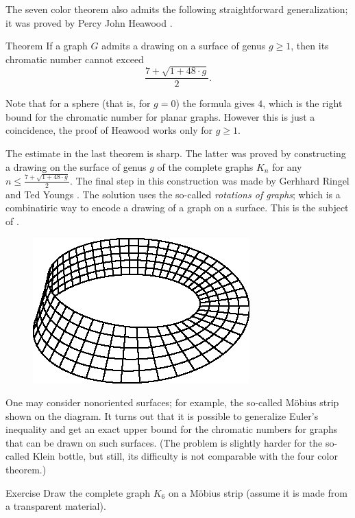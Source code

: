 The seven color theorem also admits the following straightforward generalization;
it was proved by Percy John Heawood \cite{heawood}.

\begin{thm}{Theorem}
If a graph $G$ admits a drawing on a surface of genus $g\ge 1$, 
then its chromatic number cannot exceed 
\[\frac{7+\sqrt{1+48\cdot g}}2.\]
\end{thm}

Note that for a sphere (that is, for $g=0$) the formula gives $4$, which is the right bound for the chromatic number for planar graphs. 
However this is just a coincidence, the proof of Heawood works only for $g\ge 1$.

The estimate in the last theorem is sharp.
The latter was proved by constructing a drawing on the surface of genus $g$
of the complete graphs $K_n$ for any $n\le\frac{7+\sqrt{1+48\cdot g}}2$.
The final step in this construction was made by Gerhhard Ringel and Ted Youngs \cite{ringel-youngs}.
The solution uses the so-called \emph{rotations of graphs}; which is a combinatiric way to encode a drawing of a graph on a surface.
This is the subject of \cite[Chapter 10]{hartsfield-ringel}.

\begin{figure}
\vskip-0mm
\centering
\includegraphics{asy/moebius}
\vskip-0mm
\end{figure}

One may consider nonoriented surfaces; for example, the so-called M\"obius strip shown on the diagram.
It turns out that it is possible to generalize Euler's inequality and get an exact upper bound for the chromatic numbers for graphs that can be drawn on such surfaces.
(The problem is slightly harder for the so-called Klein bottle, but still, its difficulty is not comparable with the four color theorem.)

\begin{thm}{Exercise}
Draw the complete graph $K_6$ on a M\"obius strip (assume it is made from a transparent material).
\end{thm}


 
